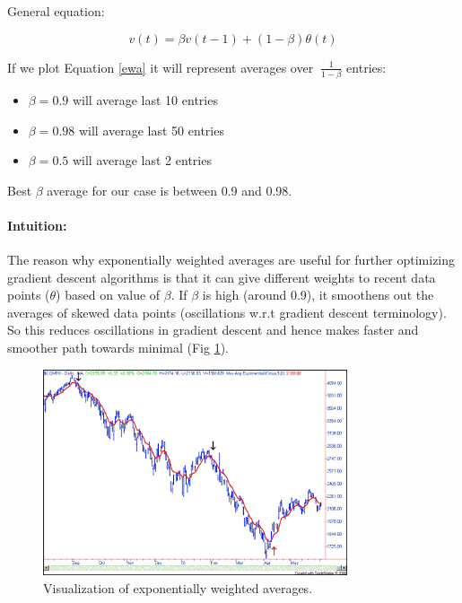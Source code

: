 General equation:

\begin{equation}\label{ewa}
    v(t) = \beta v(t-1) + (1 - \beta) \theta (t)
\end{equation}

If we plot Equation \ref{ewa} it will represent averages over $ ~ \frac{1}{1-\beta}$ entries:

\begin{itemize}
    \item $\beta = 0.9$ will average last 10 entries
    \item $\beta = 0.98$ will average last 50 entries
    \item $\beta = 0.5$ will average last 2 entries
\end{itemize}

Best $\beta$ average for our case is between 0.9 and 0.98.

\paragraph{Intuition:} The reason why exponentially weighted averages are useful for further optimizing gradient descent algorithms is that it can give different weights to recent data points ($\theta$) based on value of $\beta$. If $\beta$ is high (around 0.9), it smoothens out the averages of skewed data points (oscillations w.r.t gradient descent terminology). So this reduces oscillations in gradient descent and hence makes faster and smoother path towards minimal (Fig \ref{ewa-example}).

\begin{figure}[!htbp]
    \centering
    \includegraphics[width=0.8\textwidth]{img/c2/ewa.png}
    \caption{Visualization of exponentially weighted averages.}
    \label{ewa-example}
\end{figure}

